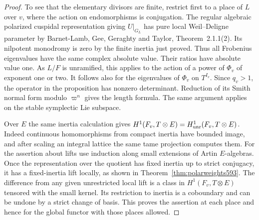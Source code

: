 \documentclass[a4paper,11pt]{article}
\theoremstyle{definition}
\theoremstyle{remark}
\numberwithin{equation}{section}
\begin{document}
\begin{proof}
To see that the elementary divisors are finite, restrict first
to a place of \(L\) over \(v\), where the action on endomorphisms
is conjugation. The regular algebraic polarized cuspidal
representation giving \(U|_{G_L}\) has pure local
Weil--Deligne parameter by Barnet-Lamb, Gee, Geraghty and
Taylor, Theorem~2.1.1(2). Its nilpotent monodromy is zero
by the finite inertia just proved. Thus all Frobenius
eigenvalues have the same complex absolute value. Their
ratios have absolute value one. As \(L/F\) is unramified,
this applies to the action of a power of \(\Phi_v\) of
exponent one or two. It follows also for the eigenvalues
of \(\Phi_v\) on \(T^{I_v}\). Since \(q_v>1\), the operator
in the proposition has nonzero determinant. Reduction of its
Smith normal form modulo \(\varpi^n\) gives the length formula.
The same argument applies on the stable symplectic Lie
subspace. \cite{XII-IX-blggt560}

Over \(E\) the same inertia calculation gives
\(H^1(F_v,T\otimes E)=H^1_{\rm unr}(F_v,T\otimes E)\).
Indeed continuous homomorphisms from compact inertia have
bounded image, and after scaling an integral lattice the same
tame projection computes them. For the assertion about lifts
use induction along small extensions of Artin \(E\)-algebras.
Once the representation over the quotient has fixed inertia
up to strict conjugacy, it has a fixed-inertia lift locally,
as shown in Theorem~\ref{thm:polarweights593}. The difference
from any given unrestricted local lift is a class in
\(H^1(F_v,T\otimes E)\) tensored with the small kernel. Its
restriction to inertia is a coboundary and can be undone by
a strict change of basis. This proves the assertion at each
place and hence for the global functor with those places allowed.
\end{proof}
\end{document}
